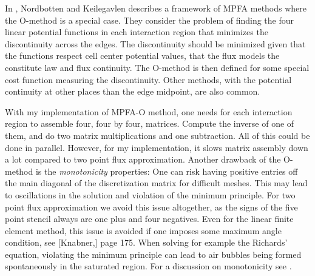 \documentclass[../Main/main.tex]{subfiles}
\begin{document}
	\par
	In \cite{nordbotten2020introduction}, Nordbotten and Keilegavlen describes a framework of MPFA methods where the O-method is a special case. They consider the problem of finding the four linear potential functions in each interaction region that minimizes the discontinuity across the edges. The discontinuity should be minimized given that the functions respect cell center potential values, that the flux models the constitute law and flux continuity. The O-method is then defined for some special cost function measuring the discontinuity. Other methods, with the potential continuity at other places than the edge midpoint, are also common.
	\par 
	With my implementation of MPFA-O method, one needs for each interaction region to assemble four, four by four, matrices. Compute the inverse of one of them, and do two matrix multiplications and one subtraction. All of this could be done in parallel. However, for my implementation, it slows matrix assembly down a lot compared to two point flux approximation. Another drawback of the O-method is the \emph{monotonicity} properties: One can risk having positive entries off the main diagonal of the discretization matrix for difficult meshes. This may lead to oscillations in the solution and violation of the minimum principle. For two point flux approximation we avoid this issue altogether, as the signs of the five point stencil always are one plus and four negatives. Even for the linear finite element method, this issue is avoided if one imposes some maximum angle condition, see [Knabner,\cite{Knabner}] page 175. When solving for example the Richards' equation, violating the minimum principle can lead to air bubbles being formed spontaneously in the saturated region. For a discussion on monotonicity see \cite{10.1007/s00211-006-0060-z}.
\end{document}
